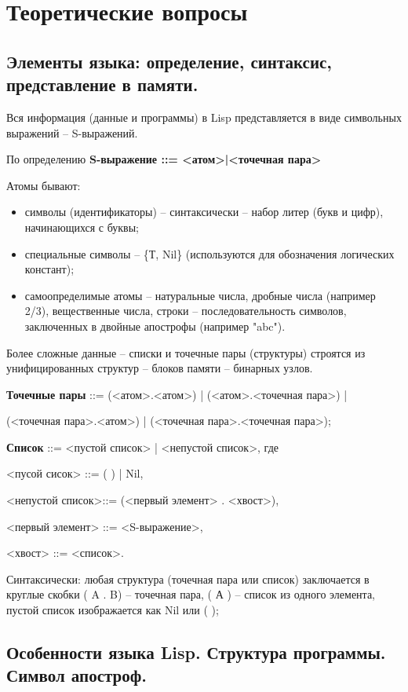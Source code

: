 \section{Теоретические вопросы}

\subsection{Элементы языка: определение, синтаксис, представление в памяти.}

Вся информация (данные и программы) в Lisp представляется в виде символьных выражений -- S-выражений. 

По определению \textbf{S-выражение ::= <атом>|<точечная пара>}

Атомы бывают:
\begin{itemize}[label*=---]
	\item символы (идентификаторы) -- синтаксически --  набор литер (букв и цифр), начинающихся с буквы;
	\item специальные символы -- \{Т, Nil\} (используются для обозначения логических констант);
	\item самоопределимые атомы -- натуральные числа, дробные числа (например 2/3), вещественные числа, строки -- последовательность символов, заключенных в двойные апострофы (например "abc").
\end{itemize}

Более сложные данные -- списки и точечные пары (структуры) строятся из унифицированных структур -- блоков памяти -- бинарных узлов.

\textbf{Точечные пары} ::= (<атом>.<атом>) | (<атом>.<точечная пара>) |

(<точечная пара>.<атом>) | (<точечная пара>.<точечная пара>);


\textbf{Список} ::= <пустой список> | <непустой список>, где

 <пусой сисок> ::= ( ) | Nil,
 
<непустой список>::= (<первый элемент> . <хвост>),

 <первый элемент> ::= <S-выражение>,
 
<хвост> ::= <список>.

Синтаксически: любая структура (точечная пара или список) заключается в круглые скобки ( A . B) -- точечная пара, ( А ) -- список из одного элемента, пустой список изображается как Nil или ( );

\subsection{Особенности языка Lisp. Структура программы. Символ апостроф.}

